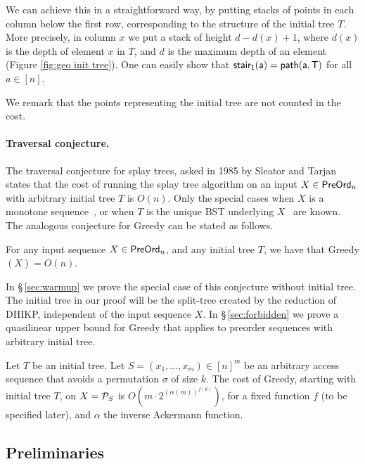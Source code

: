 We can achieve this in a straightforward way, by putting stacks of points in each column below the first row, corresponding to the structure of the initial tree $T$. More precisely, in column $x$ we put a stack of height $d-d(x)+1$, where $d(x)$ is the depth of element $x$ in $T$, and $d$ is the maximum depth of an element (Figure \ref{fig:geo init tree}). One can easily show that ${\sf stair_1(a)}={\sf path(a,T)}$ for all $a\in[n]$.

We remark that the points representing the initial tree are not counted in the cost.


\iffalse
\paragraph{Traversal conjecture.}
The traversal conjecture for splay trees, asked in 1985 by Sleator and Tarjan~\cite{ST85} states that the cost of running the splay tree algorithm on an input $X \in {\sf PreOrd}_n$ with arbitrary initial tree $T$ is $O(n)$. Only the special cases when $X$ is a monotone sequence~\cite{tarjan_sequential, pettie_DS}, or when $T$ is the unique BST underlying $X$~\cite{chaudhuri} are known. The analogous conjecture for {\sc Greedy} can be stated as follows. 

\begin{conjecture} 
For any input sequence $X \in {\sf PreOrd}_n$, and any initial tree $T$, we have that {\sc Greedy}$(X) = O(n)$.   
\end{conjecture} 

In \S\,\ref{sec:warmup} we prove the special case of this conjecture without initial tree. The initial tree in our proof will be the split-tree created by the reduction of DHIKP, independent of the input sequence $X$. In \S\,\ref{sec:forbidden} we prove a quasilinear upper bound for {\sc Greedy} that applies to preorder sequences with arbitrary initial tree.

\begin{theorem}
\label{thm:pseudo}
Let $T$ be an initial tree. 
Let $S = (x_1, \dots, x_m) \in [n]^m$ be an arbitrary access sequence that avoids a permutation $\sigma$ of size $k$. The cost of {\sc Greedy}, starting with initial tree $T$, on $X = {\mathcal{P}}_S$ is $O\left(m \cdot 2^{({\alpha(m)})^{f(k)}}\right)$, for a fixed function $f$ (to be specified later), and $\alpha$ the inverse Ackermann function. 
\end{theorem}



\subsection{Preliminaries}

